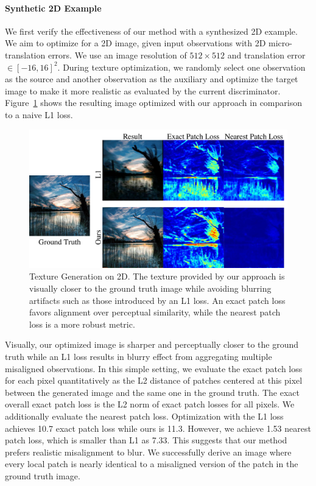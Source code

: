 \paragraph*{Synthetic 2D Example}
We first verify the effectiveness of our method with a synthesized 2D example. 
We aim to optimize for a 2D image, given input observations with 2D micro-translation errors.
We use an image resolution of $512\times 512$ and translation error $\in[-16,16]^2$. 
During texture optimization,  we randomly select one observation as the source and another observation as the auxiliary and optimize the target image to make it more realistic as evaluated by the current discriminator. 
Figure~\ref{fig:3dlite-2d-example} shows the resulting image optimized with our approach in comparison to a naive L1 loss.
\begin{figure}
    \centering
    \includegraphics[width=0.8\linewidth]{texturegen/figures/exp2d.pdf}
    \caption{Texture Generation on 2D. The texture provided by our approach is visually closer to the ground truth image while avoiding blurring artifacts such as those introduced by an L1 loss.
    An exact patch loss favors alignment over perceptual similarity, while the nearest patch loss is a more robust metric.
    }
    \label{fig:3dlite-2d-example}
\end{figure}

Visually, our optimized image is sharper and perceptually closer to the ground truth while an  L1 loss results in blurry effect from aggregating multiple misaligned observations. 
In this simple setting, we evaluate the exact patch loss for each pixel quantitatively as the L2 distance of patches centered at this pixel between the generated image and the same one in the ground truth. The exact overall exact patch loss is the L2 norm of exact patch losses for all pixels. We additionally evaluate the nearest patch loss.
Optimization with the L1 loss achieves 10.7 exact patch loss while ours is 11.3. However, we achieve 1.53 nearest patch loss, which is smaller than L1 as 7.33. This suggests that our method prefers realistic misalignment to blur. We successfully derive an image where every local patch is nearly identical to a misaligned version of the patch in the ground truth image.

